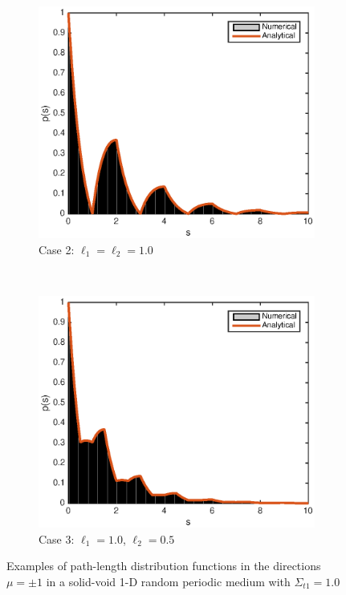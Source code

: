\documentclass[12pt]{article}
\begin{document}
\begin{figure}[hbt]
\begin{subfigure}{0.495\textwidth}
        \includegraphics[width=\textwidth]{fig2b.eps}
        \caption{Case 2: $\ell_1=\ell_2=1.0$}
        \label{fig2b}
    \end{subfigure}
    \\
    \begin{subfigure}{0.495\textwidth}
        \centering
        \includegraphics[width=\textwidth]{fig2c.eps}
        \caption{Case 3: $\ell_1=1.0$, $\ell_2=0.5$}
        \label{fig2c}
    \end{subfigure}
    \caption{Examples of path-length distribution functions in the directions $\mu=\pm 1$ in a solid-void 1-D random periodic medium with $\Sigma_{t1}=1.0$ }
    \label{fig2}
\end{figure}
\end{document}
